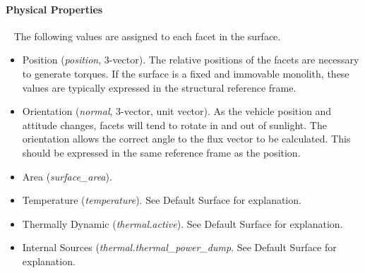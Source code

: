 \paragraph{Physical Properties} \ \newline
The following values are assigned to each facet in the surface.
\begin{itemize}
\item {Position (\textit{position}, 3-vector)}. \newline
The relative positions of the facets are necessary to generate torques.  If the surface is a fixed and immovable monolith, these values are typically expressed in the structural reference frame.
\item{Orientation (\textit{normal}, 3-vector, unit vector)}.  \newline
As the vehicle position and attitude changes, facets will tend to rotate in and out of sunlight.  The orientation allows the correct angle to the flux vector to be calculated.  This should be expressed in the same reference frame as the position.
\item{Area (\textit{surface\_area})}.
\item{Temperature (\textit{temperature})}.  \newline See Default Surface for explanation.
\item{Thermally Dynamic (\textit{thermal.active})}.  \newline
See Default Surface for explanation.
\item{Internal Sources (\textit{thermal.thermal\_power\_dump}}.  \newline See Default Surface for explanation.
\end{itemize}

